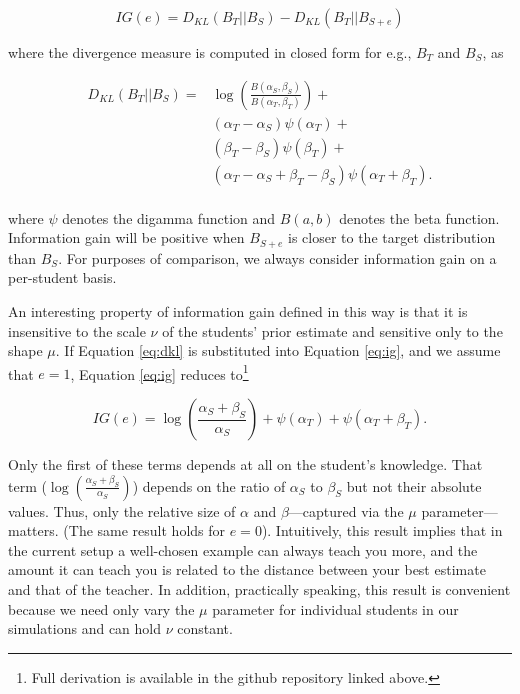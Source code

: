 \documentclass[10pt,letterpaper]{article}
\begin{document}

\begin{equation}
\label{eq:ig}
IG(e) = D_{KL} ( B_T || B_{S} )  - D_{KL} (B_T ||B_{S+e} ) 
\end{equation}

\noindent where the divergence measure is computed in closed form for e.g., $B_T$ and $B_S$, as

\begin{equation}
\label{eq:dkl}
\begin{split}
D_{KL} (B_T ||B_{S} )  = & \log( \frac{B(\alpha_{S},\beta_{S})}{B(\alpha_{T},\beta_{T})}) + \\
& (\alpha_T - \alpha_S) \psi (\alpha_T) + \\ 
& (\beta_T - \beta_S) \psi (\beta_T) + \\
& (\alpha_T - \alpha_S + \beta_T - \beta_S) \psi (\alpha_T + \beta_T). \\
\end{split}
\end{equation}

\noindent where $\psi$ denotes the digamma function and $B(a,b)$ denotes the beta function. Information gain will be positive when $B_{S+e}$ is closer to the target distribution than $B_S$. For purposes of comparison, we always consider information gain on a per-student basis. 

An interesting property of information gain defined in this way is that it is insensitive to the scale $\nu$ of the students' prior estimate and sensitive only to the shape $\mu$. If Equation \ref{eq:dkl} is substituted into Equation \ref{eq:ig}, and we assume that $e=1$, Equation \ref{eq:ig} reduces to\footnote{Full derivation is available in the github repository linked above.} 

\begin{equation}
IG(e) = \log(\frac{\alpha_S + \beta_S}{\alpha_S}) + \psi (\alpha_T) + \psi (\alpha_T + \beta_T).
\end{equation}

\noindent Only the first of these terms depends at all on the student's knowledge. That term ($\log(\frac{\alpha_S + \beta_S}{\alpha_S})$) depends on the ratio of $\alpha_S$ to $\beta_S$ but not their absolute values. Thus, only the relative size of $\alpha$ and $\beta$---captured via the $\mu$ parameter---matters. (The same result holds for $e=0$). Intuitively, this result implies that in the current setup a well-chosen example can always teach you more, and the amount it can teach you is related to the distance between your best estimate and that of the teacher. In addition, practically speaking, this result is convenient because we need only vary the $\mu$ parameter for individual students in our simulations and can hold $\nu$ constant.
\end{document}
